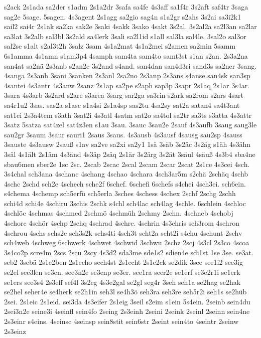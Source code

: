 {s2ack
2s1ada
sa2der
s1adm
2s1a2dr
3safa
sa4fe
4s3aff
sa1f4r
3s2aft
saf4tr
3saga
sag2e
5sage.
5sagen.
4s3agent
2s1agg
sa2gio
sag4n
s1a2gr
s2ahs
3s2ai
sa3i2k1
sail2
sai4r
2s1ak
sa2ka
sak2e
3saki
4sakk
3sako
4sakt
3s2al.
3s2al2a
sa2l3an
sa2lar
sa3lat
3s2alb
sal3bl
3s2ald
sa4lerk
3sali
sa2l1id
s1all
sal3la
sal4le.
3sal2o
sal3or
sal2se
s1alt
s2al3t2h
3salz
3sam
4s1a2mat
4s1a2mei
s2amen
sa2min
5samm
6s1amma
4s1amn
s1am3p4
4samph
sam4ta
sam4to
samt3st
s1an
s2an.
2s3a2na
san4at
sa2nä
2s3anb
s2an2c
3s2and
s4and.
san4dan
san4d3ri
sand3s
sa2ner
3sang.
4sanga
2s3anh
3sani
3sanken
2s3anl
2sa2no
2s3anp
2s3ans
s4anse
san4sk
san3sp
4santei
4s3antr
4s3anw
2sanz
2s1ap
sa2pe
s2aph
sap3p
3sapr
2s1aq
2s1ar
3s4ar.
3sara
4s3arb
3s2ard
s2are
s3area
3sarg
sar2ga
sa3rin
s2ark
sa2rom
s2ars
4sart
sa4r1u2
3sas.
sas2a
s1asc
s1a4si
2s1a4sp
sas2tu
4sa2sy
sat2a
satan4
sa4t3ant
sat1ei
2s3a4tem
s3ath
3sat2i
4s3atl
4satm
sat2o
sa4tol
sa2tr
sa3ts
s3atta
4s3attr
3satz
5satza
sat4zel
sat4z3en
s1au
3sau.
3sauc
3sau2e
2sauf
4s3aufb
3saug
saug3le
sau2gr
3saum
3saur
sauri1
2saus
3saus.
4s3ausb
4s3ausf
4sausg
sau2sp
4sauss
3sauste
4s3ausw
2sauß
s1av
sa2ve
sa2xi
sa2y1
1sä
3säb
3s2äc
3s2äg
s1äh
4s3ähn
3säl
4s1ält
2s1äm
4s3änd
4s3äp
2säq
2s1är
3s2ärg
3s2ät
3säul
4säuß
4s3b4
sba4ne
sbau6men
sber2e
1sc
2sc.
2scab
2scac
2scal
2scam
2scar
2scat
2s1ce
4s3cei
4sch.
3s4chal
sch3ana
4schanc
4schang
4schao
4schara
4sch3ar5m
s2chä
2schäq
4schb
4schc
2schd
sch2e
4schech
sche2f
6schef.
6schefi
6schefs
s4chei
4sch3ei.
sch6ein.
s4chema
4schemp
sch5erfü
sch5erla
3sches
4schess
4schex
2schf
2schg
2schh
schi4d
schi4e
4schiru
3schis
2schk
s4chl
sch4lac
sch4lag
4schle.
6schlein
4schloc
4schlöc
4schmas
4schmed
2schmö
4schmüh
2schmy
2schn.
4schneb
4schobj
4schorc
4schör
4schp
2schq
4schrad
4schre.
4schrin
4s3chris
sch3rom
4schron
4schrou
4schs
schs2e
sch3s2k
schs4ti
4sch3t
scht2a
scht2i
s4chu
4schunt
2schv
sch4web
4schweg
6schwerk
4schwet
4schwid
3schwu
2schz
2scj
4s3cl
2s3co
4scoa
3s4co2p
scre4m
2scs
2scu
2scy
4s3d2
sda3me
sde1s2
sdien4e
sdi1st
1se
3se.
se3at.
seb2
3sebä
2s1e2ben
2s1echo
sech4st
2s1echt
2s1e2ck
se2dik
3see
see1i2
see3ig
se2el
see3len
se3en.
see3n2e
se3enp
se3er.
see1ra
seer2e
se1erf
se3e2r1i
se1erk
se1ers
see3s4
2s3eff
sef4l
3s2eg
4s3e2gal
se2gl
seg4r
3seh
seh1a
se2hag
se2hak
se2hel
seher4e
se4herk
se2h1in
seh3l
se4h3ö
seh3ra
seh3re
seh5r2i
seh1s
se2hüb
2sei.
2s1eic
2s1eid.
sei3da
4s3eifer
2s1eig
3seil
s2eim
s1ein
5s4ein.
2seinb
sein4du
2sei3n2e
seine3i
4seinfl
sein4fo
2seing
2s3einh
2seini
2seink
2seinl
2seinn
sein4ne
2s3einr
s4eins.
4seinsc
4seinsp
sein8stit
sein6str
2seint
sein4to
4seintr
2seinw
2s3einz
}

